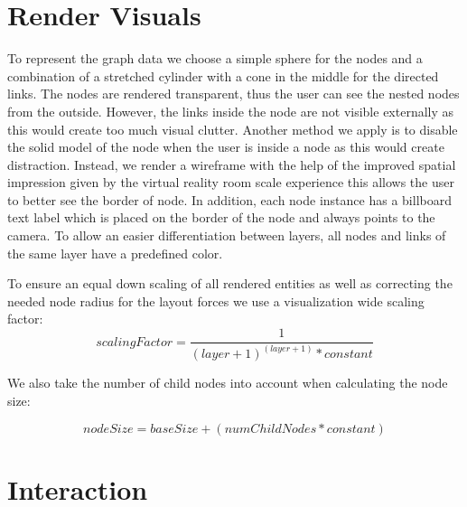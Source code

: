 \section{Render Visuals}

To represent the graph data we choose a simple sphere for the nodes and a combination of a stretched cylinder with a cone in the middle for the directed links. The nodes are rendered transparent, thus the user can see the nested nodes from the outside. However, the links inside the node are not visible externally as this would create too much visual clutter. 
Another method we apply is to disable the solid model of the node when the user is inside a node as this would create distraction. Instead, we render a wireframe with the help of the improved spatial impression given by the virtual reality room scale experience this allows the user to better see the border of node. 
In addition, each node instance has a billboard text label which is placed on the border of the node and always points to the camera. To allow an easier differentiation between layers, all nodes and links of the same layer have a predefined color.

To ensure an equal down scaling of all rendered entities as well as correcting the needed node radius for the layout forces we use a visualization wide scaling factor:
\begin{equation}
    scalingFactor = \frac{1}{(layer+1)^{(layer+1)} * constant}
\end{equation}

We also take the number of child nodes into account when calculating the node size: 

\begin{equation}
    nodeSize = baseSize + (numChildNodes * constant)
\end{equation}

\section{Interaction}
\label{chap:solution-interaction}

